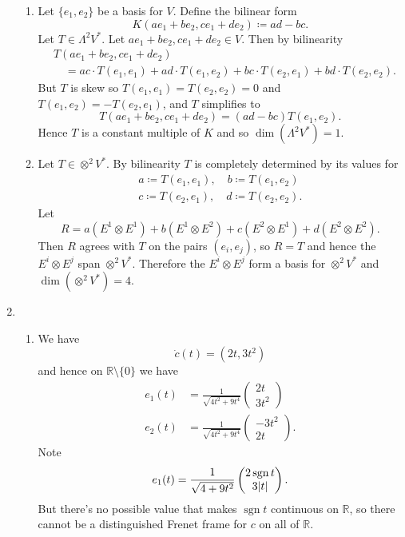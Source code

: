 \documentclass[a4paper, 12pt]{article}
\newcommand{\R}{\mathbb{R}}
\DeclarePairedDelimiter\abs{\lvert}{\rvert}
\DeclareMathOperator{\sgn}{sgn}
\begin{document}
\begin{enumerate}
\begin{enumerate}
\item Let \(\{e_1,e_2\}\) be a basis for \(V\). Define the bilinear form
\[K(ae_1+be_2,ce_1+de_2)\coloneqq ad-bc.\]
Let \(T\in\Lambda^2V^*\). Let \(ae_1+be_2,ce_1+de_2\in V\). Then by bilinearity
\begin{align*}
&T(ae_1+be_2,ce_1+de_2)\\
&\quad=ac\cdot T(e_1,e_1)+ad\cdot T(e_1,e_2)+bc\cdot T(e_2,e_1)+bd\cdot T(e_2,e_2).
\end{align*}
But \(T\) is skew so \(T(e_1,e_1)=T(e_2,e_2)=0\) and \(T(e_1,e_2)=-T(e_2,e_1)\), and \(T\) simplifies to
\[T(ae_1+be_2,ce_1+de_2)=(ad-bc)T(e_1,e_2).\]
Hence \(T\) is a constant multiple of \(K\) and so \(\dim(\Lambda^2V^*)=1\).
\item Let \(T\in\otimes^2V^*\). By bilinearity \(T\) is completely determined by its values for
\begin{gather*}
a\coloneqq T(e_1,e_1),\quad b\coloneqq T(e_1,e_2)\\
c\coloneqq T(e_2,e_1),\quad d\coloneqq T(e_2,e_2).
\end{gather*}
Let
\[R=a(E^1\otimes E^1)+b(E^1\otimes E^2)+c(E^2\otimes E^1)+d(E^2\otimes E^2).\]
Then \(R\) agrees with \(T\) on the pairs \((e_i,e_j)\), so \(R=T\) and hence the \(E^i\otimes E^j\) span \(\otimes^2V^*\). Therefore the \(E^i\otimes E^j\) form a basis for \(\otimes^2V^*\) and \(\dim(\otimes^2V^*)=4\).

\end{enumerate}

\item \begin{enumerate}

\item We have
\[\dot c(t)=(2t,3t^2)\]
and hence on \(\R\setminus\{0\}\) we have
\begin{align*}
e_1(t)&=\frac1{\sqrt{4t^2+9t^4}}\begin{pmatrix}2t\\3t^2\end{pmatrix}\\
e_2(t)&=\frac1{\sqrt{4t^2+9t^4}}\begin{pmatrix}-3t^2\\2t\end{pmatrix}.
\end{align*}
Note
\[e_1(t)=\frac1{\sqrt{4+9t^2}}\begin{pmatrix}2\sgn t\\3\abs{t}\end{pmatrix}.\]
But there's no possible value that makes \(\sgn t\) continuous on \(\R\), so there cannot be a distinguished Frenet frame for \(c\) on all of \(\R\).


\end{enumerate}
\end{enumerate}
\end{document}
